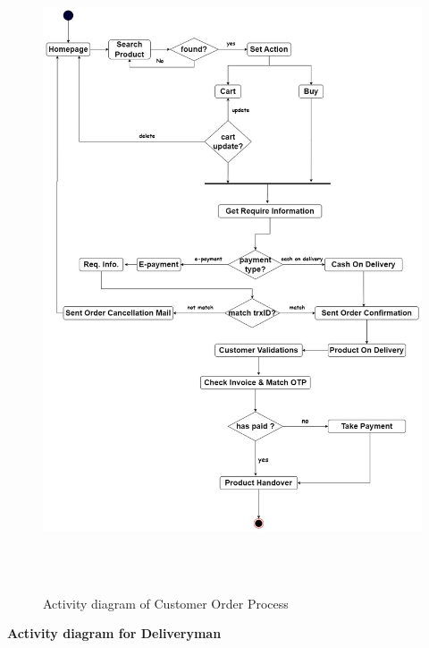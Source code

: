 \begin{figure}[ht]
    \centering  
    \includegraphics[width=\textwidth,height=19cm]{acivity diagram/activity diagram customer order process.jpg}    
    \caption{Activity diagram of Customer Order Process}
    \label{fig:fig 4.12}
\end{figure}
\newpage
\textbf{Activity diagram for Deliveryman}\\
